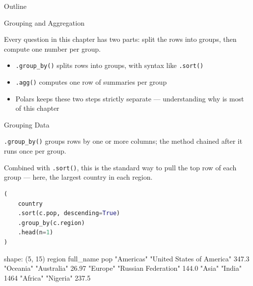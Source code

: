 \documentclass[8pt,aspectratio=169]{beamer}
\begin{document}
\begin{outlineframe}{Outline}
\end{outlineframe}

\begin{textframe}{Grouping and Aggregation}

Every question in this chapter has two parts: split the rows into groups, then compute one number per group.

\begin{itemize}
\item \texttt{.group\_by()} splits rows into groups, with syntax like \texttt{.sort()}
\item \texttt{.agg()} computes one row of summaries per group
\item Polars keeps these two steps strictly separate --- understanding why is most of this chapter
\end{itemize}

\end{textframe}

\begin{frame}[fragile]{Grouping Data}
\begin{splitcode}{%

\texttt{.group\_by()} groups rows by one or more columns; the method chained after it runs once per group.

Combined with \texttt{.sort()}, this is the standard way to pull the top row of each group --- here, the largest country in each region.

}
\begin{lstlisting}[language=Python]
(
    country
    .sort(c.pop, descending=True)
    .group_by(c.region)
    .head(n=1)
)
\end{lstlisting}
\begin{codeoutput}
shape: (5, 15)
region      full_name                    pop
"Americas"  "United States of America"   347.3
"Oceania"   "Australia"                  26.97
"Europe"    "Russian Federation"         144.0
"Asia"      "India"                      1464
"Africa"    "Nigeria"                    237.5
\end{codeoutput}
\end{splitcode}
\end{frame}
\end{document}
